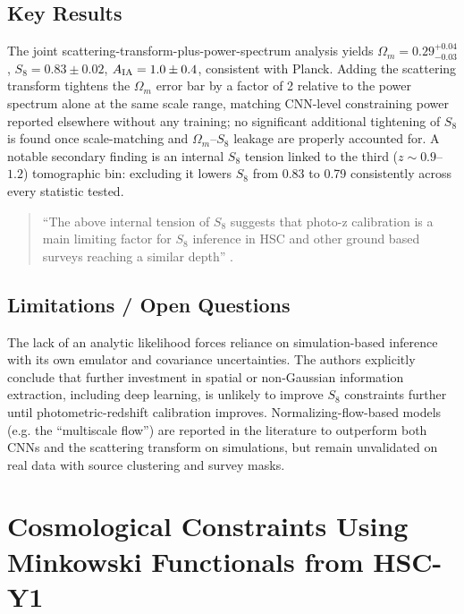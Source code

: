 \documentclass[11pt]{article}
\begin{document}
\subsection{Key Results}
The joint scattering-transform-plus-power-spectrum analysis yields $\Omega_m=0.29^{+0.04}_{-0.03}$, $S_8=0.83\pm0.02$, $A_{\rm IA}=1.0\pm0.4$, consistent with Planck. Adding the scattering transform tightens the $\Omega_m$ error bar by a factor of 2 relative to the power spectrum alone at the same scale range, matching CNN-level constraining power reported elsewhere without any training; no significant additional tightening of $S_8$ is found once scale-matching and $\Omega_m$–$S_8$ leakage are properly accounted for. A notable secondary finding is an internal $S_8$ tension linked to the third ($z\sim0.9$–$1.2$) tomographic bin: excluding it lowers $S_8$ from 0.83 to 0.79 consistently across every statistic tested.

\begin{quote}
\enquote{The above internal tension of $S_8$ suggests that photo-z calibration is a main limiting factor for $S_8$ inference in HSC and other ground based surveys reaching a similar depth} \citep[p.~8]{cheng2024scattering}.
\end{quote}

\subsection{Limitations / Open Questions}
The lack of an analytic likelihood forces reliance on simulation-based inference with its own emulator and covariance uncertainties. The authors explicitly conclude that further investment in spatial or non-Gaussian information extraction, including deep learning, is unlikely to improve $S_8$ constraints further until photometric-redshift calibration improves. Normalizing-flow-based models (e.g. the ``multiscale flow'') are reported in the literature to outperform both CNNs and the scattering transform on simulations, but remain unvalidated on real data with source clustering and survey masks.

\section{Cosmological Constraints Using Minkowski Functionals from HSC-Y1}
\label{sec:paper5}
\end{document}
